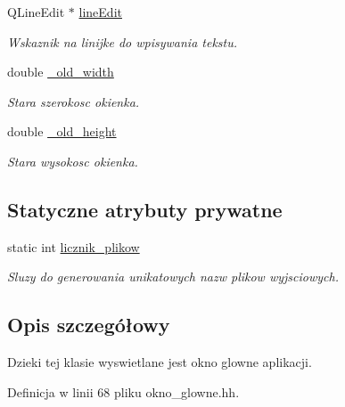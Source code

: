 \begin{DoxyCompactItemize}
Q\-Line\-Edit $\ast$ \hyperlink{class_okno_glowne_a0112b8be70a26552b03f38fab43a3301}{line\-Edit}
\begin{DoxyCompactList}\small\item\em Wskaznik na linijke do wpisywania tekstu. \end{DoxyCompactList}\item 
double \hyperlink{class_okno_glowne_a6a0922607c0970ecdfe8adec7a773c7f}{\-\_\-old\-\_\-width}
\begin{DoxyCompactList}\small\item\em Stara szerokosc okienka. \end{DoxyCompactList}\item 
double \hyperlink{class_okno_glowne_a7dae1b25dbade179eb6dfc30ffeab14b}{\-\_\-old\-\_\-height}
\begin{DoxyCompactList}\small\item\em Stara wysokosc okienka. \end{DoxyCompactList}\end{DoxyCompactItemize}
\subsection*{Statyczne atrybuty prywatne}
\begin{DoxyCompactItemize}
\item 
static int \hyperlink{class_okno_glowne_ae615cbd9c9f9ab06b365c4692ff68729}{licznik\-\_\-plikow}
\begin{DoxyCompactList}\small\item\em Sluzy do generowania unikatowych nazw plikow wyjsciowych. \end{DoxyCompactList}\end{DoxyCompactItemize}


\subsection{Opis szczegółowy}
Dzieki tej klasie wyswietlane jest okno glowne aplikacji. 

Definicja w linii 68 pliku okno\-\_\-glowne.\-hh.



